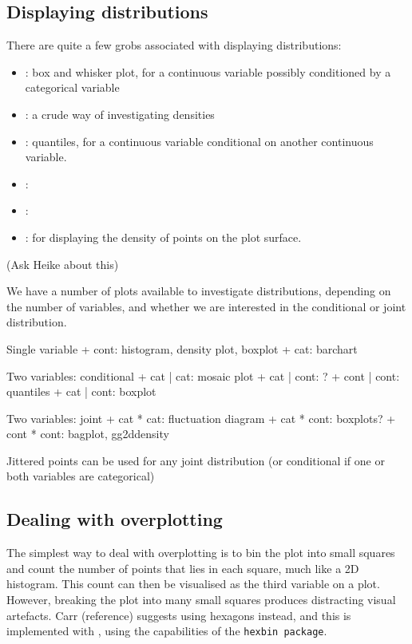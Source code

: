 \subsection{Displaying distributions}\label{sec:distributions}

There are quite a few grobs associated with displaying distributions:

\begin{itemize}
	\item {}: box and whisker plot, for a continuous variable possibly conditioned by a categorical variable
	\item {}: a crude way of investigating densities
	\item {}: quantiles, for a continuous variable conditional on another continuous variable.
	\item {}: 
	\item {}: 
	\item {}: for displaying the density of points on the plot surface.
\end{itemize}

(Ask Heike about this)

We have a number of plots available to investigate distributions, depending on the number of variables, and whether we are interested in the conditional or joint distribution.

Single variable
+ cont: histogram, density plot, boxplot
+ cat:  barchart

Two variables: conditional
+ cat  | cat:  mosaic plot
+ cat  | cont: ?
+ cont | cont: quantiles
+ cat  | cont: boxplot

Two variables: joint
+ cat  * cat:  fluctuation diagram
+ cat  * cont: boxplots?
+ cont * cont: bagplot, gg2ddensity

Jittered points can be used for any joint distribution (or conditional if one or both variables are categorical)

\subsection{Dealing with overplotting}\label{sec:overplotting}

The simplest way to deal with overplotting is to bin the plot into small squares and count the number of points that lies in each square, much like a 2D histogram.  This count can then be visualised as the third variable on a plot.  However, breaking the plot into many small squares produces distracting visual artefacts.  Carr (reference) suggests using hexagons instead, and this is implemented with , using the capabilities of the {\tt hexbin package}.

